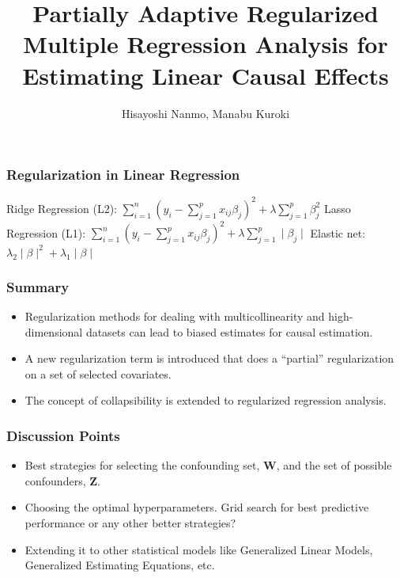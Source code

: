 \documentclass{beamer}
\title{Partially Adaptive Regularized Multiple Regression Analysis for Estimating Linear Causal Effects}
\author{Hisayoshi Nanmo, Manabu Kuroki}
\date{}
\begin{document}
\maketitle

\begin{frame}
	\frametitle{Regularization in Linear Regression}
		Ridge Regression (L2): $ \sum_{i=1}^{n} (y_i - \sum_{j=1}^{p} x_{ij} \beta_j)^2 + \lambda \sum_{j=1}^{p} \beta_j^2 $
		Lasso Regression (L1): $ \sum_{i=1}^{n} (y_i - \sum_{j=1}^{p} x_{ij} \beta_j)^2 + \lambda \sum_{j=1}^{p} \mid \beta_j \mid $
		Elastic net: $ \lambda_2 \mid \beta \mid ^2 + \lambda_1 \mid \beta \mid $
\end{frame}


\begin{frame}
	\frametitle{Summary}
	\begin{itemize}
		\item Regularization methods for dealing with multicollinearity
			and high-dimensional datasets can lead to biased
			estimates for causal estimation.
		\item A new regularization term is introduced that does a
			``partial'' regularization on a set of selected
			covariates.
		\item The concept of collapsibility is extended to regularized
			regression analysis.
	\end{itemize}

\end{frame}

\begin{frame}
	\frametitle{Discussion Points}
	\begin{itemize}
		\item Best strategies for selecting the confounding set, $
			\bm{W} $, and the set of possible confounders, $ \bm{Z}
			$.
		\item Choosing the optimal hyperparameters. Grid search for best 
			predictive performance or any other better strategies?
		\item Extending it to other statistical models like Generalized
			Linear Models, Generalized Estimating Equations, etc.
	\end{itemize}
\end{frame}
\end{document}
